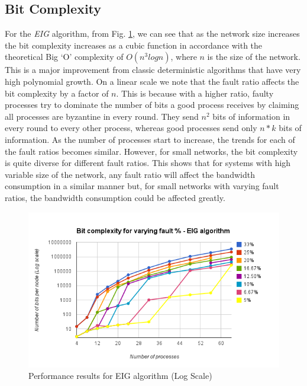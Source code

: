 \subsection{Bit Complexity}
For the \textit{EIG} algorithm, from Fig. \ref{fig:eig}, we can see that as the network size increases the bit complexity increases as a cubic function in accordance with the theoretical Big `O' complexity of $O(n^3 logn)$, where $n$ is the size of the network. This is a major improvement from classic deterministic algorithms that have very high polynomial growth. On a linear scale we note that the fault ratio affects the bit complexity by a factor of $n$. This is because with a higher ratio, faulty processes try to dominate the number of bits a good process receives by claiming all processes are byzantine in every round. They send $n^2$ bits of information in every round to every other process, whereas good processes send only $n*k$ bits of information. As the number of processes start to increase, the trends for each of the fault ratios becomes similar. However, for small networks, the bit complexity is quite diverse for different fault ratios. This shows that for systems with high variable size of the network, any fault ratio will affect the bandwidth consumption in a similar manner but, for small networks with varying fault ratios, the bandwidth consumption could be affected greatly.   
\begin{figure}[ht]
 \centering
\includegraphics[scale=0.4]{eig}
\caption{Performance results for EIG algorithm (Log Scale)}
 \label{fig:eig}
\vspace{-2mm}
\end{figure}

